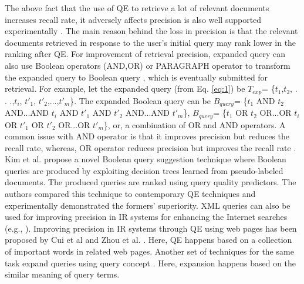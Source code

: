 The above fact that the use of QE to retrieve a lot of relevant documents increases recall rate, it adversely affects precision is also well supported experimentally  \cite{harman1996overview,he2009studying,pakhomov2016corpus}. 
The main reason behind the loss in precision is that the relevant documents retrieved in response to the user's initial query may rank lower in the ranking after QE. For improvement of retrieval precision, expanded query can also use Boolean operators (AND,OR) or PARAGRAPH operator \cite{moldovan2000using} to transform the expanded query to Boolean query \cite{pane2000improving,kim2011automatic}, which is eventually submitted for retrieval. For example, let the expanded query (from Eq. \ref{eq:1}) be $T_{exp}$= \{$t_{1}$,$t_2$, . . .,$t_i$, $t'_1$, $t'_2$,...,$t'_m$\}. The expanded Boolean query can be $B_{query}$= \{$t_{1}$ AND $t_2$ AND...AND $t_i$ AND $t'_1$ AND $t'_2$ AND...AND $t'_m$\}, $B_{query}$= \{$t_{1}$ OR $t_2$ OR...OR $t_i$ OR $t'_1$ OR $t'_2$ OR...OR $t'_m$\}, or, a combination of OR and AND operators. A common issue with AND operator is that it improves precision but reduces the recall rate, whereas, OR operator reduces precision but improves the recall rate \cite{turtle1994natural}. Kim et al. \cite{kim2011automatic} propose a novel Boolean query suggestion technique where Boolean queries are produced by exploiting decision trees learned from pseudo-labeled documents. The produced queries are ranked using query quality predictors. The authors compared this technique to contemporary QE techniques and experimentally demonstrated the formers' superiority. XML queries can also be used for improving  precision in IR systems for enhancing the Internet searches (e.g., \cite{kamps2006articulating,chu2006semantic,junedi2012xml}). Improving  precision in IR systems through QE using web pages has been proposed by Cui et al \cite{cui2002probabilistic,cui2003query} and Zhou et al. \cite{zhou2012improving}. Here, QE happens based on a collection of important words in related web pages.  Another set of techniques for the same task expand queries using query concept \cite{qiu1993concept,fonseca2005concept,hsu2008combining,dalton2014entity}. Here, expansion happens based on the similar meaning of query terms.

